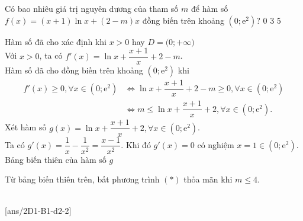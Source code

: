 \begin{ex}
	Có bao nhiêu giá trị nguyên dương của tham số $m$ để hàm số $f(x)=(x+1)\ln x+(2-m)x$ đồng biến trên khoảng $(0;\mathrm{e}^2)$?
	\choice
	{0}
	{3}
	{5}
	{}
	\loigiai
	{Hàm số đã cho xác định khi $x>0$ hay $D=\big(0;+\infty\big)$\\
			Với $x>0$, ta có $f'(x)=\ln x+\dfrac{x+1}{x}+2-m$.\\
			Hàm số đã cho đồng biến trên khoảng $(0;\mathrm{e}^2)$ khi
			\allowdisplaybreaks
			\begin{align*}
				f'(x) \geq 0, \forall x \in (0;\mathrm{e}^2) &\Leftrightarrow \ln x+\dfrac{x+1}{x}+2-m \geq 0, \forall x \in (0;\mathrm{e}^2)\\
				&\Leftrightarrow m \leq \ln x+\dfrac{x+1}{x}+2, \forall x \in (0;\mathrm{e}^2). \tag{$*$}
			\end{align*}
			Xét hàm số $g(x)=\ln x+\dfrac{x+1}{x}+2, \forall x \in (0;\mathrm{e}^2)$.\\
			Ta có $g'(x)=\dfrac{1}{x}-\dfrac{1}{x^2}=\dfrac{x-1}{x^2}$. Khi đó $g'(x)=0$ có nghiệm $x=1 \in (0;\mathrm{e}^2)$.\\
			Bảng biến thiên của hàm số $g$
			\begin{center}
			\end{center}
			Từ bảng biến thiên trên, bất phương trình $(*)$ thỏa mãn khi $m \leq 4$.
	}
\end{ex} 



 \\
	
[ans/2D1-B1-d2-2]

